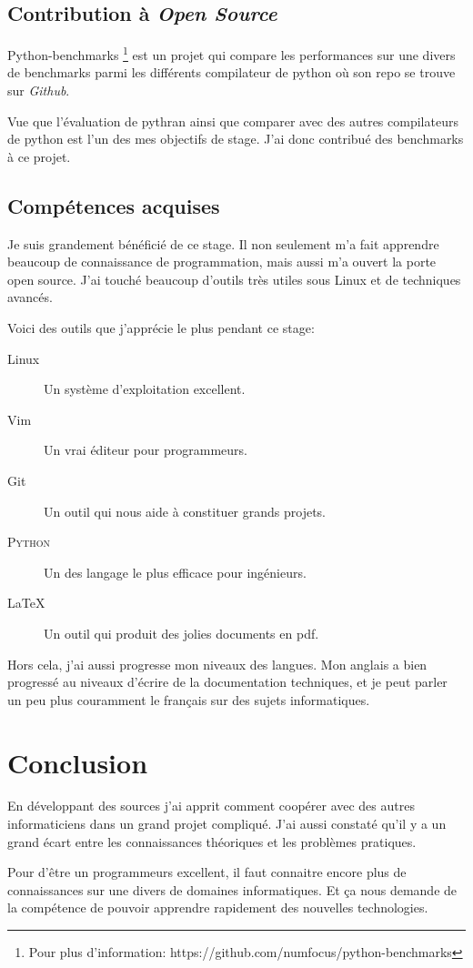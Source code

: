 \documentclass[a4paper, 11pt]{article}
\newcommand\Python{\textsc{Python}}
\begin{document}
\subsection*{Contribution à \emph{Open Source}}
Python-benchmarks \footnote{Pour plus d'information: https://github.com/numfocus/python-benchmarks}
est un projet qui compare les performances sur une divers de
benchmarks parmi les différents compilateur de python où son repo se trouve 
sur \emph{Github}.

Vue que l'évaluation de pythran ainsi que comparer avec des autres compilateurs
de python est l'un des mes objectifs de stage. J'ai donc contribué des
benchmarks à ce projet.


\subsection*{Compétences acquises}
Je suis grandement bénéficié de ce stage. Il non seulement m'a fait
apprendre beaucoup de connaissance de programmation, mais aussi m'a ouvert la
porte open source. J'ai touché beaucoup d'outils très utiles sous Linux et de
techniques avancés.

Voici des outils que j'apprécie le plus pendant ce stage:

\begin{description}
  \item[Linux] \hfill
    Un système d'exploitation excellent.
  \item[Vim] \hfill
    Un vrai éditeur pour programmeurs.
  \item[Git] \hfill
    Un outil qui nous aide à constituer grands projets.
  \item[\Python{}] \hfill
    Un des langage le plus efficace pour ingénieurs.
  \item[\LaTeX] \hfill
    Un outil qui produit des jolies documents en pdf.
\end{description}


Hors cela, j'ai aussi progresse mon niveaux des langues. Mon anglais a bien
progressé au niveaux d'écrire de la documentation techniques, et je peut parler
un peu plus couramment le français sur des sujets informatiques.

\section{Conclusion}
\label{sec:conclusion}
En développant des sources j'ai apprit comment coopérer avec des autres
informaticiens dans un grand projet compliqué. J'ai aussi constaté qu'il 
y a un grand écart entre les connaissances théoriques et les problèmes pratiques.

Pour d'être un programmeurs excellent, il faut connaitre encore plus de
connaissances sur une divers de domaines informatiques. Et ça nous demande de
la compétence de pouvoir apprendre rapidement des nouvelles technologies.
\end{document}
